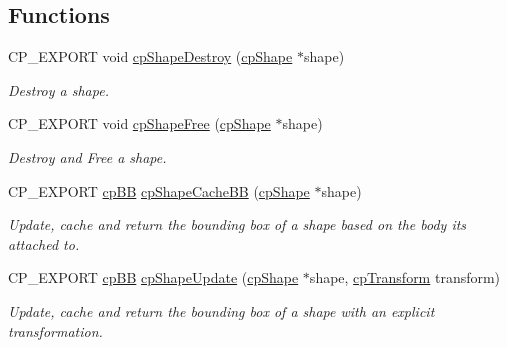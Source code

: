 \subsection*{Functions}
\begin{DoxyCompactItemize}
\item 
\mbox{\label{group__cpShape_ga16db3767b479bc1dcd169f362fa80cb5}} 
C\+P\+\_\+\+E\+X\+P\+O\+RT void \hyperlink{group__cpShape_ga16db3767b479bc1dcd169f362fa80cb5}{cp\+Shape\+Destroy} (\hyperlink{structcpShape}{cp\+Shape} $\ast$shape)
\begin{DoxyCompactList}\small\item\em Destroy a shape. \end{DoxyCompactList}\item 
\mbox{\label{group__cpShape_ga02e1c9ffa26da3a0a40d6846a3d1dbe7}} 
C\+P\+\_\+\+E\+X\+P\+O\+RT void \hyperlink{group__cpShape_ga02e1c9ffa26da3a0a40d6846a3d1dbe7}{cp\+Shape\+Free} (\hyperlink{structcpShape}{cp\+Shape} $\ast$shape)
\begin{DoxyCompactList}\small\item\em Destroy and Free a shape. \end{DoxyCompactList}\item 
\mbox{\label{group__cpShape_ga899d6f70c74747d4cb52b778447c81e8}} 
C\+P\+\_\+\+E\+X\+P\+O\+RT \hyperlink{structcpBB}{cp\+BB} \hyperlink{group__cpShape_ga899d6f70c74747d4cb52b778447c81e8}{cp\+Shape\+Cache\+BB} (\hyperlink{structcpShape}{cp\+Shape} $\ast$shape)
\begin{DoxyCompactList}\small\item\em Update, cache and return the bounding box of a shape based on the body it\textquotesingle{}s attached to. \end{DoxyCompactList}\item 
\mbox{\label{group__cpShape_gaa3ce1518fb4739b0b4e8964dfb7cd728}} 
C\+P\+\_\+\+E\+X\+P\+O\+RT \hyperlink{structcpBB}{cp\+BB} \hyperlink{group__cpShape_gaa3ce1518fb4739b0b4e8964dfb7cd728}{cp\+Shape\+Update} (\hyperlink{structcpShape}{cp\+Shape} $\ast$shape, \hyperlink{structcpTransform}{cp\+Transform} transform)
\begin{DoxyCompactList}\small\item\em Update, cache and return the bounding box of a shape with an explicit transformation. \end{DoxyCompactList}\item 

\end{DoxyCompactItemize}
